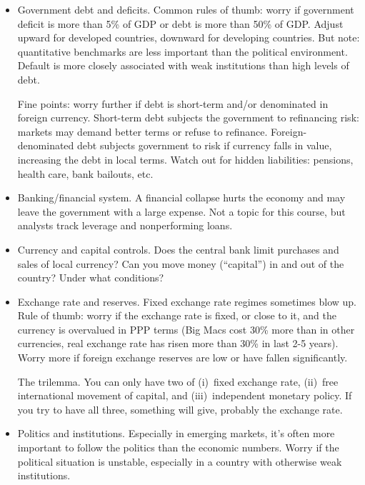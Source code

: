 \documentclass[letterpaper,12pt]{article}
\begin{document}
%
\begin{itemize}
\item Government debt and deficits.
Common rules of thumb:  worry if government
deficit is more than 5\% of GDP or debt is more than 50\% of GDP.
Adjust upward for developed countries, downward for developing countries.
But note:  quantitative benchmarks are less important than the political environment.
Default is more closely associated with weak institutions than high levels of debt.  

Fine points:  worry further if debt is short-term and/or denominated in foreign currency.
Short-term debt subjects the government to refinancing risk:
 markets may demand better terms or refuse to refinance.  Foreign-denominated debt subjects government to risk
if currency falls in value, increasing the debt in local terms.
Watch out for hidden liabilities:  pensions, health care, bank bailouts, etc.

\item Banking/financial system.
A financial collapse hurts the economy
and may leave the government with a large expense.
Not a topic for this course, but analysts track leverage
and nonperforming loans.

\item Currency and capital controls.
Does the central bank limit purchases and sales of local currency?
Can you move money (``capital'') in and out of the country?
Under what conditions?

\item Exchange rate and reserves.
Fixed exchange rate regimes sometimes blow up.
Rule of thumb:  worry if the exchange rate is fixed, or close to it,
and the currency is overvalued in PPP terms
(Big Macs cost 30\% more than in other currencies,
real exchange rate has risen more than 30\% in last 2-5 years).
Worry more if foreign exchange reserves
are low or have fallen significantly.

The trilemma.  You can only have two of
(i)~fixed exchange rate, (ii)~free international movement of capital,
and (iii)~independent monetary policy.  If you try to have all three,
something will give, probably the exchange rate.



\item Politics and institutions.
Especially in emerging markets, it's often more important to follow the politics than the economic numbers.
Worry if the political situation is unstable, especially in a country
with otherwise weak institutions.
\end{itemize}
\end{document}
